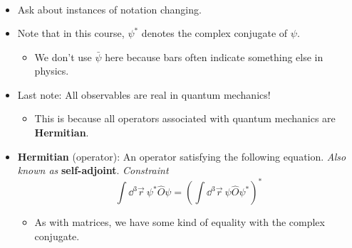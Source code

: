 \documentclass[../notes.tex]{subfiles}
\begin{document}
\begin{itemize}
\begin{itemize}
\begin{align*}
        \end{align*}
    \end{itemize}
    \item Ask about instances of notation changing.
    \item Note that in this course, $\psi^*$ denotes the complex conjugate of $\psi$.
    \begin{itemize}
        \item We don't use $\bar{\psi}$ here because bars often indicate something else in physics.
    \end{itemize}
    \item Last note: All observables are real in quantum mechanics!
    \begin{itemize}
        \item This is because all operators associated with quantum mechanics are \textbf{Hermitian}.
    \end{itemize}
    \item \textbf{Hermitian} (operator): An operator satisfying the following equation. \emph{Also known as} \textbf{self-adjoint}. \emph{Constraint}
    \begin{equation*}
        \int\dd^3\vec{r}\ \psi^*\hat{O}\psi = \left( \int\dd^3\vec{r}\ \psi\hat{O}\psi^* \right)^*
    \end{equation*}
    \begin{itemize}
        \item As with matrices, we have some kind of equality with the complex conjugate.
    \end{itemize}
\end{itemize}
\end{document}
